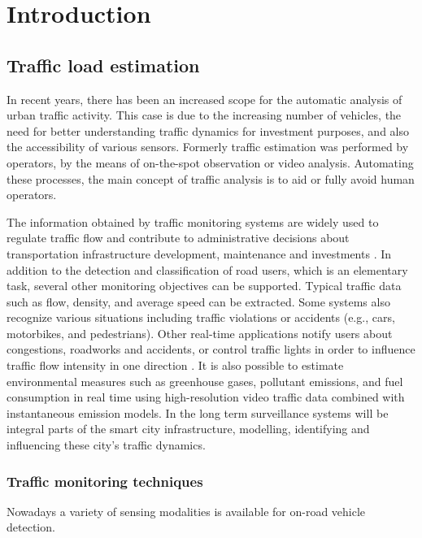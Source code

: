 \chapter*{Introduction}
\section{Traffic load estimation}
In recent years, there has been an increased scope for the automatic analysis of urban traffic activity\cite{Buch2011}.
This case is due to the increasing number of vehicles, the need for better understanding traffic dynamics for investment purposes, and also the accessibility of various sensors.
Formerly traffic estimation was performed by operators, by the means of on-the-spot observation or video analysis.
Automating these processes, the main concept of traffic analysis is to aid or fully avoid human operators.

The information obtained by traffic monitoring systems are widely used to regulate traffic flow and contribute to administrative decisions about transportation infrastructure development, maintenance and investments \cite{MagyarKozut}.
In addition to the detection and classification of road users, which is an elementary task, several other monitoring objectives can be supported. 
Typical traffic data such as flow, density, and average speed can be extracted.
Some systems also recognize various situations including traffic violations or accidents (e.g., cars, motorbikes, and pedestrians).
Other real-time applications notify users about congestions, roadworks and accidents, or control traffic lights in order to influence traffic flow intensity in one direction \cite{AzoSensor, Thiruverahan2015, Ghazal2016}.
It is also possible to estimate environmental measures such as greenhouse gases, pollutant emissions, and fuel consumption in real time using high-resolution video traffic data combined with instantaneous emission models\cite{Morris2012a}. 
In the long term surveillance systems will be integral parts of the smart city infrastructure, modelling, identifying and influencing these city's traffic dynamics\cite{enLight}.

\subsection{Traffic monitoring techniques}
Nowadays a variety of sensing modalities is available for on-road vehicle detection.

